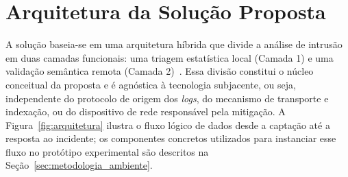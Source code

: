 \documentclass[sigconf, anonymous]{acmart}
\begin{document}
\begin{table}[htpb]
\centering
\caption{Comparativo entre a solução proposta e os trabalhos relacionados.}
\label{tab:comparativo_relacionados}
\end{table}

\section{Arquitetura da Solução Proposta}
\label{sec:solucao}

A solução baseia-se em uma arquitetura híbrida que divide a análise de intrusão em duas camadas funcionais: uma triagem estatística local (Camada 1) e uma validação semântica remota (Camada 2)~\cite{al-hammouri2025hybrid, mills2024hybrid}. Essa divisão constitui o núcleo conceitual da proposta e é agnóstica à tecnologia subjacente, ou seja, independente do protocolo de origem dos \textit{logs}, do mecanismo de transporte e indexação, ou do dispositivo de rede responsável pela mitigação. A Figura~\ref{fig:arquitetura} ilustra o fluxo lógico de dados desde a captação até a resposta ao incidente; os componentes concretos utilizados para instanciar esse fluxo no protótipo experimental são descritos na Seção~\ref{sec:metodologia_ambiente}.
\end{document}
